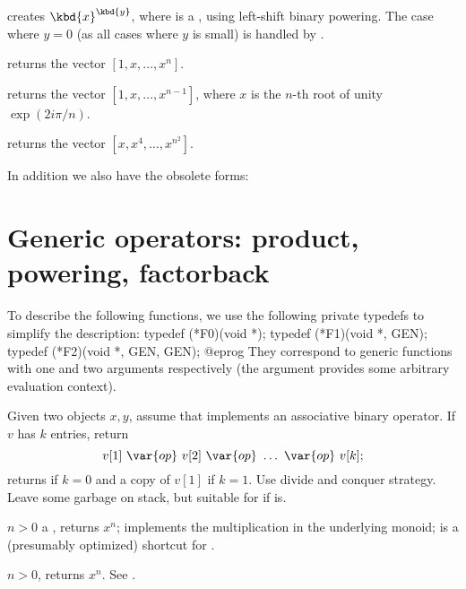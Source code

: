  creates $\kbd{x}^{\kbd{y}}$, where  is a
, using left-shift binary powering. The case where $y = 0$
(as all cases where $y$ is small) is handled by .

 returns the vector $[1,x,\dots,x^n]$.

 returns the vector
$[1,x,\dots,x^{n-1}]$, where $x$ is the $n$-th root of unity $\exp(2i\pi/n)$.

 returns the vector $[x,x^4,\dots,x^{n^2}]$.

In addition we also have the obsolete forms:





\section{Generic operators: product, powering, factorback}

To describe the following functions, we use the following private typedefs
to simplify the description:
\bprog
  typedef (*F0)(void *);
  typedef (*F1)(void *, GEN);
  typedef (*F2)(void *, GEN, GEN);
@eprog
\noindent They correspond to generic functions with one and two arguments
respectively (the  argument provides some arbitrary evaluation
context).

Given two objects $x,y$, assume that  implements an
associative binary operator. If $v$ has $k$ entries, return
$$v[1]~\var{op}~v[2]~\var{op}~\ldots ~\var{op}~v[k];$$
returns  if $k = 0$ and a copy of $v[1]$ if $k = 1$.
Use divide and conquer strategy. Leave some garbage on stack, but suitable for
 if  is.

 $n > 0$ a
, returns $x^n$;  implements the multiplication
in the underlying monoid;  is a (presumably optimized) shortcut for
.

 $n > 0$,
returns $x^n$. See .


